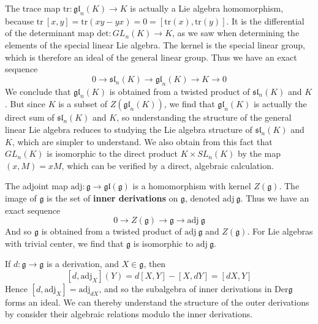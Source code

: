 \begin{example}
    The trace map $\text{tr}: \mathfrak{gl}_n(K) \to K$ is actually a Lie algebra homomorphism, because $\text{tr}\ [x,y] = \text{tr}(xy - yx) = 0 = [\text{tr}(x), \text{tr}(y)]$. It is the differential of the determinant map $\text{det}: GL_n(K) \to K$, as we saw when determining the elements of the special linear Lie algebra. The kernel is the special linear group, which is therefore an ideal of the general linear group. Thus we have an exact sequence
    \[ 0 \to \mathfrak{sl}_n(K) \to \mathfrak{gl}_n(K) \to K \to 0 \]
    We conclude that $\mathfrak{gl}_n(K)$ is obtained from a twisted product of $\mathfrak{sl}_n(K)$ and $K$. But since $K$ is a subset of $Z(\mathfrak{gl}_n(K))$, we find that $\mathfrak{gl}_n(K)$ is actually the direct sum of $\mathfrak{sl}_n(K)$ and $K$, so understanding the structure of the general linear Lie algebra reduces to studying the Lie algebra structure of $\mathfrak{sl}_n(K)$ and $K$, which are simpler to understand. We also obtain from this fact that $GL_n(K)$ is isomorphic to the direct product $K \times SL_n(K)$ by the map $(x,M) = xM$, which can be verified by a direct, algebraic calculation.
\end{example}

\begin{example}
    The adjoint map $\text{adj}: \mathfrak{g} \to \mathfrak{gl}(\mathfrak{g})$ is a homomorphism with kernel $Z(\mathfrak{g})$. The image of $\mathfrak{g}$ is the set of {\bf inner derivations} on $\mathfrak{g}$, denoted $\text{adj}\ \mathfrak{g}$. Thus we have an exact sequence
    \[ 0 \to Z(\mathfrak{g}) \to \mathfrak{g} \to \text{adj}\ \mathfrak{g} \]
    And so $\mathfrak{g}$ is obtained from a twisted product of $\text{adj}\ \mathfrak{g}$ and $Z(\mathfrak{g})$. For Lie algebras with trivial center, we find that $\mathfrak{g}$ is isomorphic to $\text{adj}\ \mathfrak{g}$.
\end{example}

\begin{example}
    If $d: \mathfrak{g} \to \mathfrak{g}$ is a derivation, and $X \in \mathfrak{g}$, then
    \[ [d,\text{adj}_X](Y) = d[X,Y] - [X,dY] = [dX,Y] \]
    Hence $[d,\text{adj}_X] = \text{adj}_{dX}$, and so the subalgebra of inner derivations in $\text{Der} \mathfrak{g}$ forms an ideal. We can thereby understand the structure of the outer derivations by consider their algebraic relations modulo the inner derivations.
\end{example}

